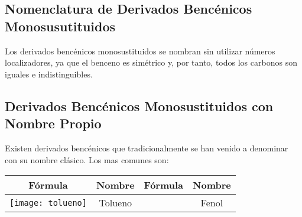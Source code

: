 \subsection{Nomenclatura de Derivados Bencénicos Monosusutituidos}

Los derivados bencénicos monosustituidos se nombran sin utilizar números localizadores, ya que el benceno es simétrico y, por tanto, todos los carbonos son iguales e indistinguibles.

\begin{figure}[h!]
	\centering
	\hspace{1cm}
\end{figure}

\subsection{Derivados Bencénicos Monosustituidos con Nombre Propio}

Existen derivados bencénicos que tradicionalmente se han venido a denominar con su nombre clásico. Los mas comunes son:

\begin{table}[h!]
	\centering
	\begin{tabular}{c|c||c|c} 
		\textbf{Fórmula}&\textbf{Nombre}&\textbf{Fórmula}&\textbf{Nombre}\\ \hline
		\texttt{[image: tolueno]}&Tolueno&{fenol}&Fenol\\
	\end{tabular}
\end{table}

